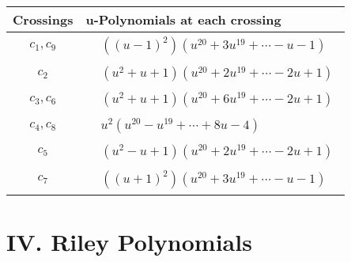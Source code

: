 \documentclass[1p]{elsarticle_modified}
\theoremstyle{definition}
\begin{document}
\begin{tabular}{m{50pt}|m{274pt}}
Crossings & \hspace{64pt}u-Polynomials at each crossing \\
\hline $$\begin{aligned}c_{1},c_{9}\end{aligned}$$&$\begin{aligned}
&((u-1)^2)(u^{20}+3 u^{19}+\cdots- u-1)
\end{aligned}$\\
\hline $$\begin{aligned}c_{2}\end{aligned}$$&$\begin{aligned}
&(u^2+u+1)(u^{20}+2 u^{19}+\cdots-2 u+1)
\end{aligned}$\\
\hline $$\begin{aligned}c_{3},c_{6}\end{aligned}$$&$\begin{aligned}
&(u^2+u+1)(u^{20}+6 u^{19}+\cdots-2 u+1)
\end{aligned}$\\
\hline $$\begin{aligned}c_{4},c_{8}\end{aligned}$$&$\begin{aligned}
&u^2(u^{20}- u^{19}+\cdots+8 u-4)
\end{aligned}$\\
\hline $$\begin{aligned}c_{5}\end{aligned}$$&$\begin{aligned}
&(u^2- u+1)(u^{20}+2 u^{19}+\cdots-2 u+1)
\end{aligned}$\\
\hline $$\begin{aligned}c_{7}\end{aligned}$$&$\begin{aligned}
&((u+1)^2)(u^{20}+3 u^{19}+\cdots- u-1)
\end{aligned}$\\
\hline
\end{tabular}\newpage\renewcommand{\arraystretch}{1}
\centering \section*{ IV. Riley Polynomials}
\end{document}
